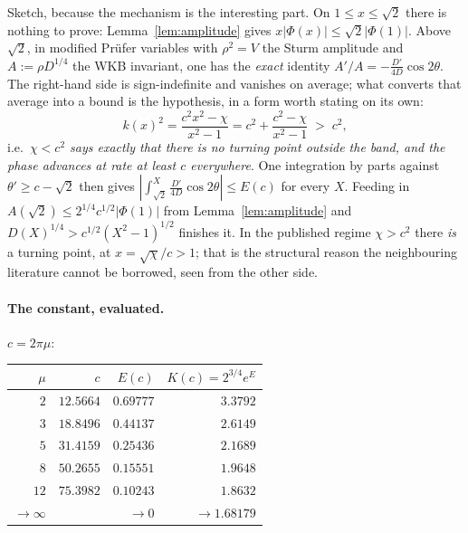 \documentclass[11pt,a4paper]{article}
\theoremstyle{plain}
\theoremstyle{definition}
\theoremstyle{remark}
\begin{document}
Sketch, because the mechanism is the interesting part.  On $1\le x\le\sqrt2$
there is nothing to prove: Lemma~\ref{lem:amplitude} gives
$x|\Phi(x)|\le\sqrt2|\Phi(1)|$.  Above $\sqrt2$, in modified Pr\"ufer variables
with $\rho^2=V$ the Sturm amplitude and $A:=\rho D^{1/4}$ the WKB invariant,
one has the \emph{exact} identity $A'/A=-\frac{D'}{4D}\cos2\theta$.  The
right-hand side is sign-indefinite and vanishes on average; what converts that
average into a bound is the hypothesis, in a form worth stating on its own:
\begin{equation}\label{eq:noturning}
  k(x)^2=\frac{c^2x^2-\chi}{x^2-1}=c^2+\frac{c^2-\chi}{x^2-1}\;>\;c^2 ,
\end{equation}
i.e.\ \emph{$\chi<c^2$ says exactly that there is no turning point outside the
band, and the phase advances at rate at least $c$ everywhere}.  One integration
by parts against $\theta'\ge c-\sqrt2$ then gives
$|\int_{\sqrt2}^X\frac{D'}{4D}\cos2\theta|\le E(c)$ for every $X$.  Feeding in
$A(\sqrt2)\le2^{1/4}c^{1/2}|\Phi(1)|$ from Lemma~\ref{lem:amplitude} and
$D(X)^{1/4}>c^{1/2}(X^2-1)^{1/2}$ finishes it.  In the published regime
$\chi>c^2$ there \emph{is} a turning point, at $x=\sqrt\chi/c>1$; that is the
structural reason the neighbouring literature cannot be borrowed, seen from the
other side.

\paragraph{The constant, evaluated.}  $c=2\pi\mu$:

\begin{center}\small
\begin{tabular}{@{}rrrr@{}}
\hline
$\mu$ & $c$ & $E(c)$ & $K(c)=2^{3/4}e^{E}$ \\
\hline
$2$ & $12.5664$ & $0.69777$ & $3.3792$ \\
$3$ & $18.8496$ & $0.44137$ & $2.6149$ \\
$5$ & $31.4159$ & $0.25436$ & $2.1689$ \\
$8$ & $50.2655$ & $0.15551$ & $1.9648$ \\
$12$ & $75.3982$ & $0.10243$ & $1.8632$ \\
\hline
$\to\infty$ & & $\to0$ & $\to1.68179$ \\
\hline
\end{tabular}
\end{center}
\end{document}
